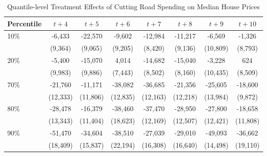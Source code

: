\documentclass{beamer}
\begin{document}
\begin{frame}{}
\frametitle{}

\begin{table}[ht]
    \hspace{-1cm}
    \caption{Quantile-level Treatment Effects of Cutting Road Spending on Median House Prices}
    \label{tab:quantile_tes}
    \scriptsize %
    \begin{tabular}{p{1cm}ccccccc}
        \hline
        Percentile & \textbf{$t + 4$} & \textbf{$t + 5$} & \textbf{$t + 6$} & \textbf{$t + 7$} & \textbf{$t + 8$} & \textbf{$t + 9$} & \textbf{$t + 10$} \\
        \hline
        10\% & -6,433 & -22,570 & -9,602 & -12,984 & -11,217 & -6,569 & -1,326 \\
        & (9,364) & (9,065) & (9,205) & (8,420) & (9,136) & (10,809) & (8,793) \\
        20\% & -5,400 & -15,070 & 4,014 & -14,682 & -15,040 & -3,228 & 624 \\
        & (9,983) & (9,886) & (7,443) & (8,502) & (8,160) & (10,435) & (8,509) \\
        70\% & -21,760 & -11,171 & -38,082 & -36,685 & -21,356 & -25,605 & -18,600 \\
        & (12,333) & (11,806) & (12,835) & (12,163) & (12,218) & (13,984) & (9,872) \\
        80\% & -28,478 & -16,379 & -38,460 & -37,470 & -28,950 & -27,800 & -18,658 \\
        & (13,343) & (11,404) & (18,623) & (12,169) & (12,507) & (12,421) & (11,808) \\
        90\% & -51,470 & -34,604 & -38,510 & -27,039 & -29,010 & -49,093 & -36,662 \\
        & (18,409) & (15,837) & (22,194) & (16,308) & (16,640) & (14,498) & (19,110) \\
        \hline
    \end{tabular}
\end{table}

\end{frame}
\end{document}
